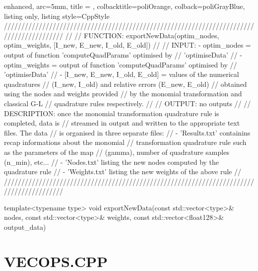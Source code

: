 \documentclass[a4paper, twosided]{book}
\begin{document}
\begin{tcblisting}{enhanced,
                   arc=5mm,
                   title = \color{black}{\large \ttfamily DatIo.cpp/exportNewData},
                   colbacktitle=poliOrange,
                   colback=poliGrayBlue,
                   listing only,
                   listing style=CppStyle}
/////////////////////////////////////////////////////////////////////////////////////////
//
//       FUNCTION: exportNewData(optim_nodes, optim_weights, [I_new, E_new, I_old, E_old])
//                
//          INPUT: - optim_nodes = output of function 'computeQuadParams' optimised by
//                                 'optimiseData'
//                 - optim_weights = output of function 'computeQuadParams' optimised by
//                                 'optimiseData'
//                 - [I_new, E_new, I_old, E_old] = values of the numerical quadratures
//                                  (I_new, I_old) and relative errors (E_new, E_old)
//                                  obtained using the nodes and weights provided 
//                                  by the monomial transformation and classical G-L
//                                  quadrature rules respectively.
//
//         OUTPUT: no outputs
//
//    DESCRIPTION: once the monomial transformation quadrature rule is completed, data is
//                 streamed in output and written to the appropriate text files. The data
//                 is organised in three separate files:
//                    - 'Results.txt' containins recap informations about the monomial
//                      transformation quadrature rule such as the parameters of the map
//                      (gamma), number of quadrature samples (n_min), etc...
//                    - 'Nodes.txt' listing the new nodes computed by the quadrature rule
//                    - 'Weights.txt' listing the new weights of the above rule
//
/////////////////////////////////////////////////////////////////////////////////////////

template<typename type>
void exportNewData(const std::vector<type>& nodes, const std::vector<type>& weights, const std::vector<float128>& output_data)
\end{tcblisting}

\newpage

\section[VecOps.cpp]{\changefont VECOPS.CPP}\label{Sec4.3}
\end{document}
